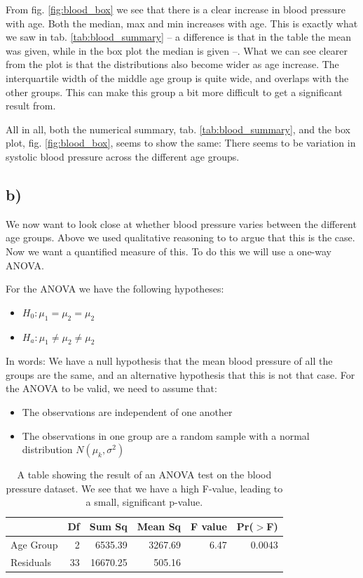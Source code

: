 \documentclass[a4paper,norsk, 10pt]{article}
\begin{document}
From fig. \ref{fig:blood_box} we see that there is a clear increase in blood pressure with age. Both the median, max and min increases with age. This is exactly what we saw in tab. \ref{tab:blood_summary} -- a difference is that in the table the mean was given, while in the box plot the median is given --. What we can see clearer from the plot is that the distributions also become wider as age increase. The interquartile width of the middle age group is quite wide, and overlaps with the other groups. This can make this group a bit more difficult to get a significant result from.

All in all, both the numerical summary, tab. \ref{tab:blood_summary}, and the box plot, fig. \ref{fig:blood_box}, seems to show the same: There seems to be variation in systolic blood pressure across the different age groups.

\subsection*{b)}

We now want to look close at whether blood pressure varies between the different age groups. Above we used qualitative reasoning to to argue that this is the case. Now we want a quantified measure of this. To do this we will use a one-way ANOVA. 

For the ANOVA we have the following hypotheses:
\begin{itemize}
  \item $H_0: \mu_1 = \mu_2 = \mu_2$
  \item $H_a:  \mu_1 \neq \mu_2 \neq \mu_2$
\end{itemize}

In words: We have a null hypothesis that the mean blood pressure of all the groups are the same, and an alternative hypothesis that this is not that case. For the ANOVA to be valid, we need to assume that: 

\begin{itemize}
  \item The observations are independent of one another
  \item The observations in one group are a random sample with a normal distribution $N(\mu_k,\sigma^2)$
\end{itemize} 



\begin{table}[!htbp]
\centering
\begin{tabular}{lrrrrr}
  \hline
 & Df & Sum Sq & Mean Sq & F value & Pr($>$F) \\ 
  \hline
Age Group & 2 & 6535.39 & 3267.69 & 6.47 & 0.0043 \\ 
  Residuals & 33 & 16670.25 & 505.16 &  &  \\ 
   \hline
\end{tabular}
\caption{A table showing the result of an ANOVA test on the blood pressure dataset. We see that we have a high F-value, leading to a small, significant p-value.}\label{tab:blood_anova}

\end{table}
\end{document}
